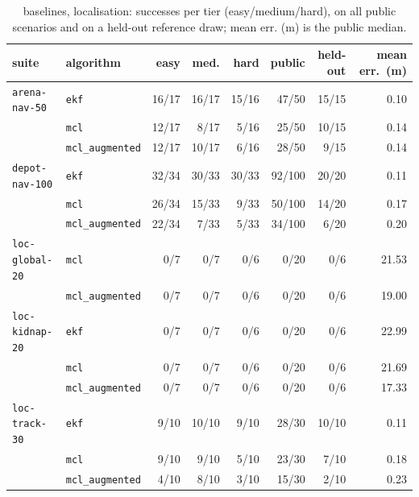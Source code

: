 \begin{table}[t]
\centering
\scriptsize
\caption{ baselines, localisation: successes per tier (easy/medium/hard), on all public scenarios and on a held-out reference draw; mean err. (m) is the public median.}
\label{tab:base-localisation}
\setlength{\tabcolsep}{2.5pt}
\begin{tabular}{llrrrrrr}
\toprule
suite & algorithm & easy & med. & hard & public & held-out & mean err.\ (m) \\
\midrule
\texttt{arena-nav-50} & \texttt{ekf} & 16/17 & 16/17 & 15/16 & 47/50 & 15/15 & 0.10 \\
 & \texttt{mcl} & 12/17 & 8/17 & 5/16 & 25/50 & 10/15 & 0.14 \\
 & \texttt{mcl\_augmented} & 12/17 & 10/17 & 6/16 & 28/50 & 9/15 & 0.14 \\
\midrule
\texttt{depot-nav-100} & \texttt{ekf} & 32/34 & 30/33 & 30/33 & 92/100 & 20/20 & 0.11 \\
 & \texttt{mcl} & 26/34 & 15/33 & 9/33 & 50/100 & 14/20 & 0.17 \\
 & \texttt{mcl\_augmented} & 22/34 & 7/33 & 5/33 & 34/100 & 6/20 & 0.20 \\
\midrule
\texttt{loc-global-20} & \texttt{mcl} & 0/7 & 0/7 & 0/6 & 0/20 & 0/6 & 21.53 \\
 & \texttt{mcl\_augmented} & 0/7 & 0/7 & 0/6 & 0/20 & 0/6 & 19.00 \\
\midrule
\texttt{loc-kidnap-20} & \texttt{ekf} & 0/7 & 0/7 & 0/6 & 0/20 & 0/6 & 22.99 \\
 & \texttt{mcl} & 0/7 & 0/7 & 0/6 & 0/20 & 0/6 & 21.69 \\
 & \texttt{mcl\_augmented} & 0/7 & 0/7 & 0/6 & 0/20 & 0/6 & 17.33 \\
\midrule
\texttt{loc-track-30} & \texttt{ekf} & 9/10 & 10/10 & 9/10 & 28/30 & 10/10 & 0.11 \\
 & \texttt{mcl} & 9/10 & 9/10 & 5/10 & 23/30 & 7/10 & 0.18 \\
 & \texttt{mcl\_augmented} & 4/10 & 8/10 & 3/10 & 15/30 & 2/10 & 0.23 \\
\bottomrule
\end{tabular}
\end{table}
